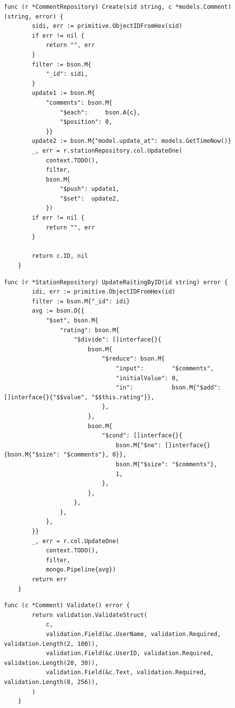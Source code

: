 \begin{lstlisting}[label=list:repo_comment_create,caption=Tworzenie komentarza w bazie danych,basicstyle=\tiny\ttfamily]
    func (r *CommentRepository) Create(sid string, c *models.Comment) (string, error) {
        sidi, err := primitive.ObjectIDFromHex(sid)
        if err != nil {
            return "", err
        }
        filter := bson.M{
            "_id": sidi,
        }
        update1 := bson.M{
            "comments": bson.M{
                "$each":     bson.A{c},
                "$position": 0,
            }}
        update2 := bson.M{"model.update_at": models.GetTimeNow()}
        _, err = r.stationRepository.col.UpdateOne(
            context.TODO(),
            filter,
            bson.M{
                "$push": update1,
                "$set":  update2,
            })
        if err != nil {
            return "", err
        }
    
        return c.ID, nil
    }
\end{lstlisting}
\begin{lstlisting}[label=list:update_rating,caption=Aktualizacja oceny stacji,basicstyle=\tiny\ttfamily]
    func (r *StationRepository) UpdateRaitingByID(id string) error {
        idi, err := primitive.ObjectIDFromHex(id)
        filter := bson.M{"_id": idi}
        avg := bson.D{{
            "$set", bson.M{
                "rating": bson.M{
                    "$divide": []interface{}{
                        bson.M{
                            "$reduce": bson.M{
                                "input":        "$comments",
                                "initialValue": 0,
                                "in":           bson.M{"$add": []interface{}{"$$value", "$$this.rating"}},
                            },
                        },
                        bson.M{
                            "$cond": []interface{}{
                                bson.M{"$ne": []interface{}{bson.M{"$size": "$comments"}, 0}},
                                bson.M{"$size": "$comments"},
                                1,
                            },
                        },
                    },
                },
            },
        }}
        _, err = r.col.UpdateOne(
            context.TODO(),
            filter,
            mongo.Pipeline{avg})
        return err
    }
\end{lstlisting}
\begin{lstlisting}[label=list:validate_comment,caption=Tworzenie komentarza w bazie danych,basicstyle=\tiny\ttfamily]
    func (c *Comment) Validate() error {
        return validation.ValidateStruct(
            c,
            validation.Field(&c.UserName, validation.Required, validation.Length(2, 100)),
            validation.Field(&c.UserID, validation.Required, validation.Length(20, 30)),
            validation.Field(&c.Text, validation.Required, validation.Length(8, 256)),
        )
    }
\end{lstlisting}


